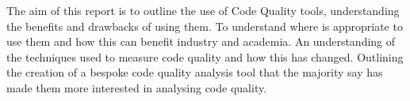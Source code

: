 
The aim of this report is to outline the use of Code Quality tools, understanding the benefits and drawbacks of using them. To understand where 
is appropriate to use them and how this can benefit industry and academia. An understanding of the techniques used to measure code quality and 
how this has changed. Outlining the creation of a bespoke code quality analysis tool that the majority say has made them more interested 
in analysing code quality.